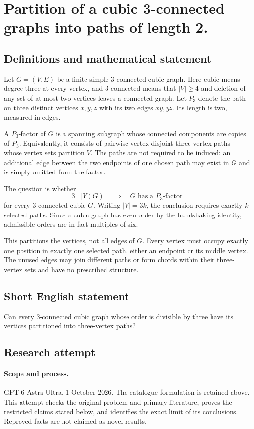 \documentclass[11pt,a4paper]{article}
\begin{document}
\section*{Partition of a cubic 3-connected graphs into paths of length 2.}\label{statement}

\subsection{Definitions and mathematical statement}
Let $G=(V,E)$ be a finite simple $3$-connected cubic
graph. Here cubic means degree three at every vertex,
and $3$-connected means that $|V|\geq4$ and deletion
of any set of at most two vertices leaves a
connected graph. Let $P_3$ denote the path on three
distinct vertices $x,y,z$ with its two edges $xy,yz$.
Its length is two, measured in edges.

A $P_3$-factor of $G$ is a spanning subgraph whose
connected components are copies of $P_3$. Equivalently,
it consists of pairwise vertex-disjoint three-vertex
paths whose vertex sets partition $V$. The paths
are not required to be induced: an additional edge
between the two endpoints of one chosen path may
exist in $G$ and is simply omitted from the factor.

The question is whether
\[
 3\mid |V(G)|\quad\Longrightarrow\quad
 G\text{ has a }P_3\text{-factor}
\]
for every $3$-connected cubic $G$. Writing $|V|=3k$,
the conclusion requires exactly $k$ selected paths.
Since a cubic graph has even order by the
handshaking identity, admissible orders are in fact
multiples of six.

This partitions the vertices, not all edges of
$G$. Every vertex must occupy exactly one position
in exactly one selected path, either an endpoint
or its middle vertex. The unused edges may join
different paths or form chords within their
three-vertex sets and have no prescribed structure.
\subsection{Short English statement}
Can every 3-connected cubic graph whose order is divisible by three have its vertices partitioned into three-vertex paths?
\subsection{Research attempt}
\paragraph{Scope and process.}
GPT-6 Astra Ultra, 1 October 2026. The catalogue formulation is retained above. This attempt checks the original problem and primary literature, proves the restricted claims stated below, and identifies the exact limit of its conclusions. Reproved facts are not claimed as novel results.
\end{document}
